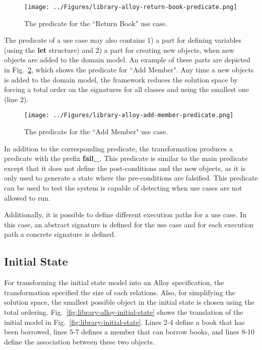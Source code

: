 \begin{figure}[h]
\centering
\texttt{[image: ../Figures/library-alloy-return-book-predicate.png]}
\caption{The predicate for the ``Return Book" use case.}
\label{fig:library-alloy-return-book-predicate}
\end{figure}

The predicate of a use case may also contains 1) a part for defining variables (using the \textbf{let} structure) and 2) a part for creating new objects, when new objects are added to the domain model. An example of these parts are depicted in Fig.~\ref{fig:library-alloy-add-member-predicate}, which shows the predicate for ``Add Member". Any time a new objects is added to the domain model, the framework reduces the solution space by forcing a total order on the signatures for all classes and using the smallest one (line 2).

\begin{figure}[h]
\centering
\texttt{[image: ../Figures/library-alloy-add-member-predicate.png]}
\caption{The predicate for the ``Add Member" use case.}
\label{fig:library-alloy-add-member-predicate}
\end{figure}

In addition to the corresponding predicate, the transformation produces a predicate with the prefix \textbf{fail\_}. This predicate is similar to the main predicate except that it does not define the post-conditions and the new objects, as it is only used to generate a state where the pre-conditions are falsified. This predicate can be used to test the system is capable of detecting when use cases are not allowed to run.

Additionally, it is possible to define different execution paths for a use case. In this case, an abstract signature is defined for the use case and for each execution path a concrete signature is defined. 

\subsection{Initial State}
\label{sec:alloy-initial-state}
For transforming the initial state model into an Alloy specification, the transformation specified the size of each relations. Also, for simplifying the solution space, the smallest possible object in the initial state is chosen using the total ordering. Fig.~\ref{fig:library-alloy-initial-state} shows the translation of the initial model in Fig.~\ref{fig:library-initial-state}. Lines 2-4 define a book that has been borrowed, lines 5-7 defines a member that can borrow books, and lines 8-10 define the association between these two objects.

